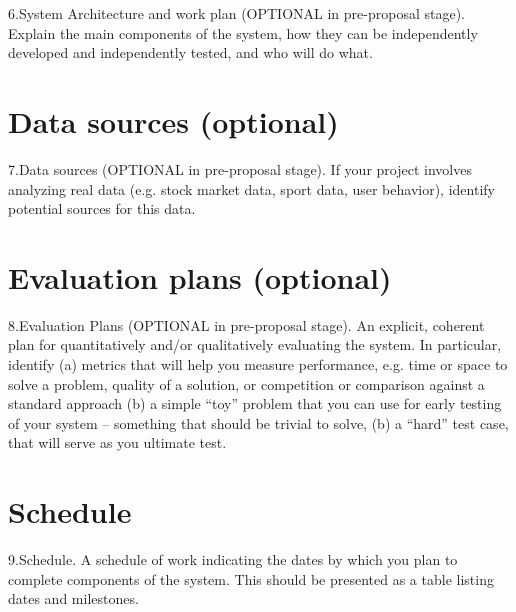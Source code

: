6.System Architecture and work plan (OPTIONAL in pre-proposal
stage). Explain the main components of the system, how they can be
independently developed and independently tested, and who will do
what.



\section{Data sources (optional)}

7.Data sources (OPTIONAL in pre-proposal stage). If your project
involves analyzing real data (e.g. stock market data, sport data, user
behavior), identify potential sources for this data.



\section{Evaluation plans (optional)}

8.Evaluation Plans (OPTIONAL in pre-proposal stage). An explicit,
coherent plan for quantitatively and/or qualitatively evaluating the
system. In particular, identify (a) metrics that will help you measure
performance, e.g. time or space to solve a problem, quality of a
solution, or competition or comparison against a standard approach (b)
a simple “toy” problem that you can use for early testing of your
system – something that should be trivial to solve, (b) a “hard” test
case, that will serve as you ultimate test.



\section{Schedule}

9.Schedule. A schedule of work indicating the dates by which you plan
to complete components of the system. This should be presented as a
table listing dates and milestones.

